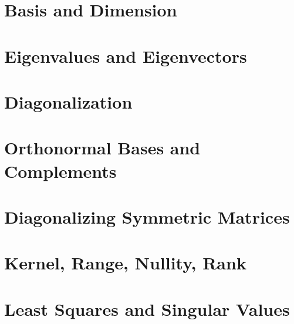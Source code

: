 \documentclass[12pt]{book}
\newcommand{\1}{{\mathrm 1\hspace*{-0.4ex}%
\rule{0.1ex}{1.52ex}\hspace*{0.2ex}}}
\begin{document}
\section{Basis and Dimension}

%

%


\section{Eigenvalues and Eigenvectors}
%
%
%

%

%

%

%


\section{Diagonalization}
%

%

%


\section{Orthonormal Bases and Complements}
%

%

%
 
%


%





%

%


\section{Diagonalizing Symmetric Matrices}

%

%

%
\section{Kernel, Range, Nullity, Rank}

%

%
\section{Least Squares and Singular Values}

%

\end{document}
